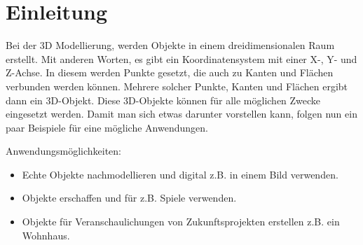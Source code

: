 \section{Einleitung}
Bei der 3D Modellierung, werden Objekte in einem dreidimensionalen Raum erstellt. Mit anderen Worten, es gibt ein Koordinatensystem mit einer X-, Y- und Z-Achse.
In diesem werden Punkte gesetzt, die auch zu Kanten und Flächen verbunden werden können. Mehrere solcher Punkte, Kanten und Flächen ergibt dann ein 3D-Objekt.
Diese 3D-Objekte können für alle möglichen Zwecke eingesetzt werden. Damit man sich etwas darunter vorstellen kann, folgen nun ein paar Beispiele für
eine mögliche Anwendungen.

Anwendungsmöglichkeiten:
\begin{itemize}
    \item Echte Objekte nachmodellieren und digital z.B. in einem Bild verwenden.
    \item Objekte erschaffen und für z.B. Spiele verwenden.
    \item Objekte für Veranschaulichungen von Zukunftsprojekten erstellen z.B. ein Wohnhaus.
\end{itemize}
